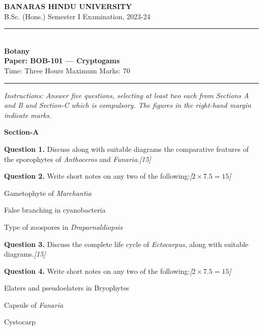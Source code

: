 \documentclass[11pt,a4paper]{article}
\newcommand{\pts}[1]{\hfill   \textit{[#1]}}
\begin{document}
\begin{center}
  {\large\bfseries BANARAS HINDU UNIVERSITY}\\[2pt]
  {\normalsize B.Sc. (Hons.) Semester I Examination, 2023-24}\\[6pt]
  \rule{0.8\linewidth}{0.5pt}\\[6pt]
  {\large\bfseries Botany}\\[4pt]
  {\large\bfseries Paper: BOB-101 --- Cryptogams}\\[4pt]
  {\normalsize Time: Three Hours \hfill Maximum Marks: 70}
\end{center}

\rule{\linewidth}{0.4pt}

\smallskip



\noindent   \textit{Instructions: Answer five questions, selecting at least two each from Sections A and B and Section-C which is compulsory. The figures in the right-hand margin indicate marks.}

\bigskip


\begin{center}
   \textbf{Section-A}
\end{center}
\medskip

\medskip


\noindent   \textbf{Question 1.} Discuss along with suitable diagrams the comparative features of the sporophytes of   \textit{Anthoceros} and   \textit{Funaria}.\pts{15}

\medskip


\noindent   \textbf{Question 2.} Write short notes on any two of the following:\pts{$2  \times 7.5 = 15$}

\begin{parts}
  \item Gametophyte of   \textit{Marchantia}
  \item False branching in cyanobacteria
  \item Type of zoospores in   \textit{Draparnaldiopsis}
\end{parts}

\medskip


\noindent   \textbf{Question 3.} Discuss the complete life cycle of   \textit{Ectocarpus}, along with suitable diagrams.\pts{15}

\medskip


\noindent   \textbf{Question 4.} Write short notes on any two of the following:\pts{$2  \times 7.5 = 15$}

\begin{parts}
  \item Elaters and pseudoelaters in Bryophytes
  \item Capsule of   \textit{Funaria}
  \item Cystocarp
\end{parts}
\end{document}
